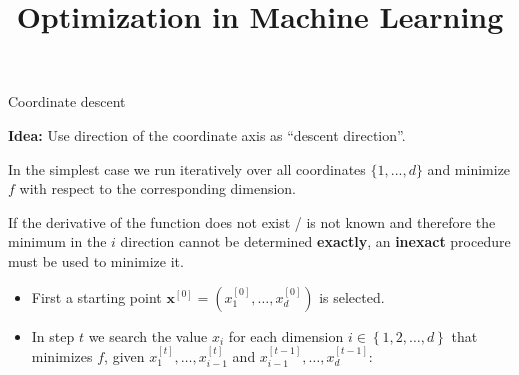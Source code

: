 \documentclass[11pt,compress,t,notes=noshow, xcolor=table]{beamer}
\title{Optimization in Machine Learning}
\date{}
\begin{document}
\sloppy


\begin{vbframe}{Coordinate descent}

\textbf{Idea:} Use direction of the coordinate axis as \enquote{descent direction}.


\lz

In the simplest case we run iteratively over all coordinates $\{1, ...,d\}$ and minimize $f$ with respect to the corresponding dimension.

\lz

If the derivative of the function does not exist / is not known and therefore the minimum in the $i$ direction cannot be determined \textbf{exactly}, an \textbf{inexact} procedure must be used to minimize it.

\framebreak

\begin{itemize}
\item First a starting point $\bm{x}^{[0]} = \left(x^{[0]}_1, \hdots, x^{[0]}_d\right)$ is selected.
\item In step $t$ we search the value $x_i$ for each dimension $i \in \left\{1,2,\hdots,d\right\}$
that minimizes $f$, given $x^{[t]}_1, \hdots,x^{[t]}_{i-1}$ and $x^{[t-1]}_{i-1}, \hdots,x^{[t-1]}_d$:
\end{itemize}


\end{vbframe}
\end{document}
